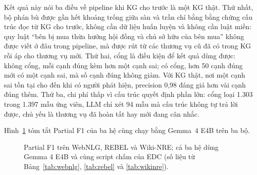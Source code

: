 Kết quả này nói ba điều về pipeline khi KG cho trước là một KG thật.
Thứ nhất, bộ phán bù được gần hết khoảng trống giữa sàn và trần chỉ bằng bằng chứng cấu trúc đọc từ KG cho trước, không cần dữ liệu huấn luyện và không cần luật miền: quy luật ``bên bị mua thừa hưởng hội đồng và chủ sở hữu của bên mua'' không được viết ở đâu trong pipeline, mà được rút từ các thương vụ cũ đã có trong KG rồi áp cho thương vụ mới.
Thứ hai, cổng là điều kiện để kết quả dùng được: không cổng, mỗi cạnh đúng kèm hơn một cạnh sai; có cổng, hơn 50 cạnh đúng mới có một cạnh sai, mà số cạnh đúng không giảm.
Với KG thật, nơi một cạnh sai tồn tại cho đến khi có người phát hiện, precision 0,98 đáng giá hơn vài cạnh đúng thêm.
Thứ ba, chi phí thấp vì cấu trúc quyết định phần lớn: cổng loại 1.303 trong 1.397 mẫu ứng viên, LLM chỉ xét 94 mẫu mà cấu trúc không tự trả lời được, chủ yếu là thương vụ đã hoàn tất hay mới đang cân nhắc.

Hình~\ref{fig:edc-f1} tóm tắt Partial F1 của ba hệ cùng chạy bằng Gemma~4 E4B trên ba bộ.

\begin{figure}[htbp]
\centering
{}
\caption{Partial F1 trên WebNLG, REBEL và Wiki-NRE; cả ba hệ dùng Gemma 4 E4B và cùng script chấm của EDC (số liệu từ Bảng~\ref{tab:webnlg}, \ref{tab:rebel} và \ref{tab:wikinre}).}\label{fig:edc-f1}
\end{figure}

